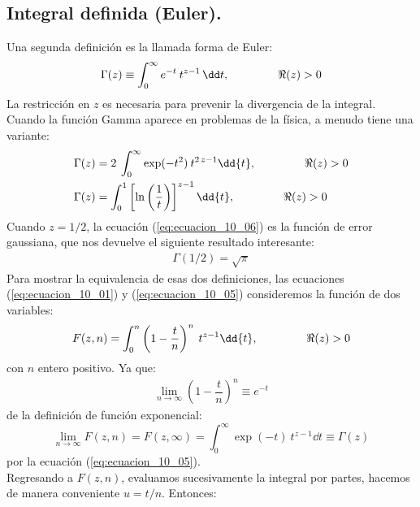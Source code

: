 \subsection{Integral definida (Euler).}

Una segunda definición es la llamada forma de Euler:
\begin{align}
\Gamma (z) \equiv \int_{0}^{\infty} e^{-t} \: t^{z - 1} \, \dd t, \hspace{1.5cm} \Re(z) > 0
\label{eq:ecuacion_10_05}
\end{align}
La restricción en $z$ es necesaria para prevenir la divergencia de la integral. Cuando la función Gamma aparece en problemas de la física, a menudo tiene una variante:
\begin{align}
\Gamma (z) &= 2 \: \int_{0}^{\infty} \exp(-t^{2}) \: t^{2 \, z - 1} \dd{t}, \hspace{1.5cm} \Re(z) > 0  \label{eq:ecuacion_10_06} \\
\Gamma (z) &=  \int_{0}^{1} \left[ \ln\left(\dfrac{1}{t} \right) \right]^{z - 1} \dd{t}, \hspace{1.5cm} \Re (z) > 0 \label{eq:ecuacion_10_07}
\end{align}
Cuando $z=1/2$, la ecuación (\ref{eq:ecuacion_10_06}) es la función de error gaussiana, que nos devuelve el siguiente resultado interesante:
\begin{align}
\Gamma (1/2) = \sqrt{\pi}
\label{eq:ecuacion_10_08}
\end{align}
Para mostrar la equivalencia de esas dos definiciones, las ecuaciones (\ref{eq:ecuacion_10_01}) y (\ref{eq:ecuacion_10_05}) consideremos la función de dos variables:
\begin{align}
F(z, n) = \int_{0}^{n} \left( 1 - \dfrac{t}{n} \right)^{n} \: t^{z - 1} \dd{t}, \hspace{1.5cm} \Re(z) > 0
\label{eq:ecuacion_10_09}
\end{align}
con $n$ entero positivo. Ya que:
\begin{align}
\lim_{n \to \infty} \left( 1 - \dfrac{t}{n} \right)^{n} \equiv e^{-t}
\label{eq:ecuacion_10_10}
\end{align}
de la definición de función exponencial:
\begin{equation}
\lim_{n \to \infty} F(z, n) = F(z, \infty) = \int_{0}^{\infty} \exp(-t) \: t^{z - 1} \dd{t} \equiv \Gamma (z)
\label{eq:ecuacion_10_11}
\end{equation}
por la ecuación (\ref{eq:ecuacion_10_05}).
\\
Regresando a $F(z,n)$, evaluamos sucesivamente la integral por partes, hacemos de manera conveniente $u = t/n$. Entonces:

